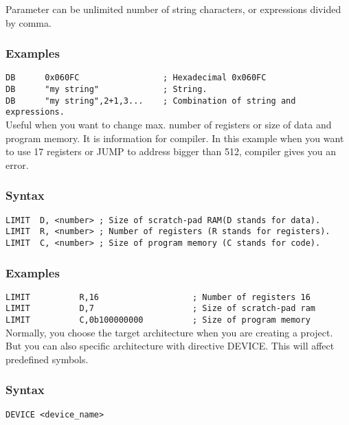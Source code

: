         Parameter can be unlimited number of string characters, or expressions divided by comma.


    \subsubsection{Examples}
        \verb'DB      0x060FC                 ; Hexadecimal 0x060FC'\\
        \verb'DB      "my string"             ; String.'\\
        \verb'DB      "my string",2+1,3...    ; Combination of string and expressions.'\\

    Useful when you want to change max. number of registers or size of  data and program memory. It is information for compiler. In this example when you want to use 17 registers or JUMP to address bigger than 512, compiler gives you an error.

    \subsubsection{Syntax}
        \verb'LIMIT  D, <number> ; Size of scratch-pad RAM(D stands for data).'\\
        \verb'LIMIT  R, <number> ; Number of registers (R stands for registers).'\\
        \verb'LIMIT  C, <number> ; Size of program memory (C stands for code).'\\

    \subsubsection{Examples}
        \verb'LIMIT          R,16                   ; Number of registers 16'\\
        \verb'LIMIT          D,7                    ; Size of scratch-pad ram   '\\
        \verb'LIMIT          C,0b100000000          ; Size of program memory '\\

    Normally, you choose the target architecture when you are creating a project. But you can also specific architecture with directive DEVICE. This will affect predefined symbols.

    \subsubsection{Syntax}
        \verb'DEVICE <device_name>'

